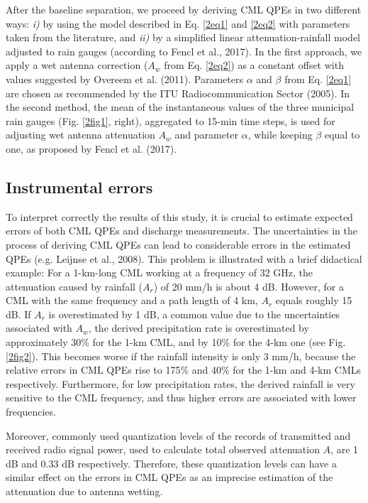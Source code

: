 \documentclass{ctuthesis}\usepackage[]{graphicx}\usepackage[]{color}
\begin{document}
After the baseline separation, we proceed by deriving CML QPEs in two different ways: \emph{i)} by using the model described in Eq. \ref{2eq1} and \ref{2eq2} with parameters taken from the literature, and \emph{ii)} by a simplified linear attenuation-rainfall model adjusted to rain gauges (according to Fencl et al., 2017). In the first approach, we apply a wet antenna correction ($A_w$ from Eq. \ref{2eq2}) as a constant offset with values suggested by Overeem et al. (2011). Parameters $\alpha$ and $\beta$ from Eq. \ref{2eq1} are chosen as recommended by the ITU Radiocommunication Sector (2005). In the second method, the mean of the instantaneous values of the three municipal rain gauges (Fig. \ref{2fig1}, right), aggregated to 15-min time steps, is used for adjusting wet antenna attenuation $A_w$ and parameter $\alpha$, while keeping $\beta$ equal to one, as proposed by Fencl et al. (2017).

\subsection{Instrumental errors} \label{InstErr}

To interpret correctly the results of this study, it is crucial to estimate expected errors of both CML QPEs and discharge measurements. The uncertainties in the process of deriving CML QPEs can lead to considerable errors in the estimated QPEs (e.g. Leijnse et al., 2008). This problem is illustrated with a brief didactical example: For a 1-km-long CML working at a frequency of 32 GHz, the attenuation caused by rainfall ($A_r$) of 20 mm/h is about 4 dB. However, for a CML with the same frequency and a path length of 4 km, $A_r$ equals roughly 15 dB. If $A_r$ is overestimated by 1 dB, a common value due to the uncertainties associated with $A_w$, the derived precipitation rate is overestimated by approximately 30\% for the 1-km CML, and by 10\% for the 4-km one (see Fig. \ref{2fig2}). This becomes worse if the rainfall intensity is only 3 mm/h, because the relative errors in CML QPEs rise to 175\% and 40\% for the 1-km and 4-km CMLs respectively. Furthermore, for low precipitation rates, the derived rainfall is very sensitive to the CML frequency, and thus higher errors are associated with lower frequencies.

Moreover, commonly used quantization levels of the records of transmitted and received radio signal power, used to calculate total observed attenuation $A$, are 1 dB and 0.33 dB respectively. Therefore, these quantization levels can have a similar effect on the errors in CML QPEs as an imprecise estimation of the attenuation due to antenna wetting.
\end{document}
